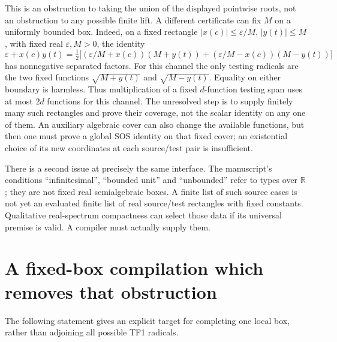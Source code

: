 \documentclass[11pt]{article}
\newcommand{\R}{\mathbb R}
\begin{document}
This is an obstruction to taking the union of the displayed
pointwise roots, not an obstruction to any possible finite lift.
A different certificate can fix $M$ on a uniformly bounded box.
Indeed, on a fixed rectangle
$|x(c)|\le\varepsilon/M$, $|y(t)|\le M$, with fixed real
$\varepsilon,M>0$, the identity
\[
 \varepsilon+x(c)y(t)=\tfrac12
 \bigl[(\varepsilon/M+x(c))(M+y(t))
       +(\varepsilon/M-x(c))(M-y(t))\bigr]
\]
has nonnegative separated factors. For this channel the only
testing radicals are the two fixed functions $\sqrt{M+y(t)}$
and $\sqrt{M-y(t)}$. Equality on either boundary is harmless.
Thus multiplication of a fixed $d$-function testing span uses
at most $2d$ functions for this channel. The unresolved step is
to supply finitely many such rectangles and prove their coverage,
not the scalar identity on any one of them.
An auxiliary algebraic cover can also change the available
functions, but then one must prove a global SOS identity on that
fixed cover; an existential choice of its new coordinates at
each source/test pair is insufficient.

There is a second issue at precisely the same interface.
The manuscript's conditions ``infinitesimal'', ``bounded unit''
and ``unbounded'' refer to types over $\R$; they are not fixed
real semialgebraic boxes. A finite list of such source cases is
not yet an evaluated finite list of real source/test rectangles
with fixed constants. Qualitative real-spectrum compactness can
select those data if its universal premise is valid. A compiler
must actually supply them.

\section{A fixed-box compilation which removes that obstruction}

The following statement gives an explicit target for completing
one local box, rather than adjoining all possible TF1 radicals.
\end{document}
